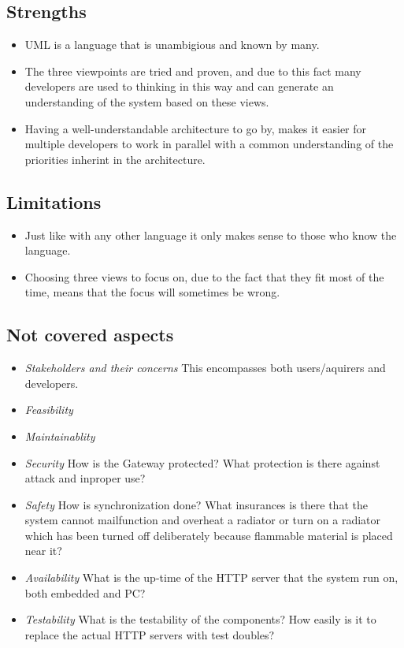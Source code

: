\documentclass[a4paper,10pt]{article}
\begin{document}
\subsection{Strengths}
\begin{itemize}
\item UML is a language that is unambigious and known by many.
\item The three viewpoints are tried and proven, and due to this fact many developers are used to thinking in this way and can generate an understanding of the system based on these views.
 \item Having a well-understandable architecture to go by, makes it easier for multiple developers to work in parallel with a common understanding of the priorities inherint in the architecture.
\end{itemize}

\subsection{Limitations}
\begin{itemize}
\item Just like with any other language it only makes sense to those who know the language. 
\item Choosing three views to focus on, due to the fact that they fit most of the time, means that the focus will sometimes be wrong.
\end{itemize}

\subsection{Not covered aspects}
\begin{itemize}
\item \emph{Stakeholders and their concerns} This encompasses both users/aquirers and developers.
\item \emph{Feasibility}
\item \emph{Maintainablity}
\item \emph{Security} How is the Gateway protected? What protection is there against attack and inproper use? 
\item \emph{Safety} How is synchronization done? What insurances is there that the system cannot mailfunction and overheat a radiator or turn on a radiator which has been turned off deliberately because flammable material is placed near it?
\item \emph{Availability} What is the up-time of the HTTP server that the system run on, both embedded and PC?
\item \emph{Testability} What is the testability of the components? How easily is it to replace the actual HTTP servers with test doubles?
\end{itemize}
\end{document}
